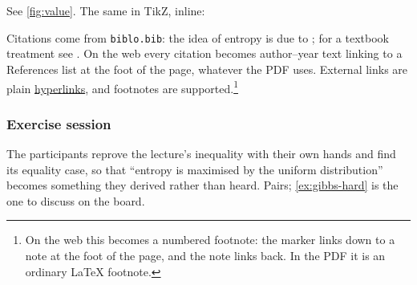 \documentclass[11pt]{article}
\begin{document}
See \cref{fig:value}. The same in TikZ, inline:

\begin{center}
\end{center}

Citations come from \texttt{biblo.bib}: the idea of entropy is due to
\cite{Shannon:48}; for a textbook treatment see \cite[ch.~4]{MacKay:03}. On
the web every citation becomes author--year text linking to a References list
at the foot of the page, whatever \verb|| the PDF uses.
External links are plain
\href{https://en.wikipedia.org/wiki/Entropy_(information_theory)}{hyperlinks},
and footnotes are supported.\footnote{On the web this becomes a numbered
  footnote: the marker links down to a note at the foot of the page, and the
  note links back. In the PDF it is an ordinary \LaTeX{} footnote.}

\subsubsection{Exercise session}
\label{sec:exercises}

\begin{teachingnote}[Intent]
The participants reprove the lecture's inequality with their own hands and
find its equality case, so that ``entropy is maximised by the uniform
distribution'' becomes something they derived rather than heard. Pairs;
\cref{ex:gibbs-hard} is the one to discuss on the board.
\end{teachingnote}

\end{document}
